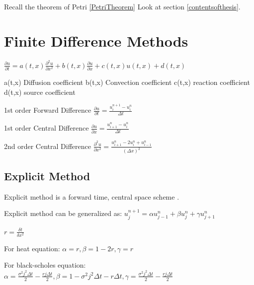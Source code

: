 \documentclass[12pt, oneside]{book}
\theoremstyle{plain}
\theoremstyle{definition}
\begin{document}
Recall the theorem of Petri \ref{PetriTheorem}
Look at section \ref{contentsofthesis}.



\section{Finite Difference Methods}
$ \frac{\partial u}{\partial t} = a(t,x) \frac{\partial^2 u}{\partial x^2} + b(t,x) \frac{\partial u}{\partial x} + c(t,x) u(t,x) + d(t,x) $

a(t,x) Diffusion coefficient
b(t,x) Convection coefficient
c(t,x) reaction coefficient
d(t,x) source coefficient

1st order Forward Difference
$ \frac{\partial u}{\partial t} = \frac{u^{n+1}_i - u^n_i}{\Delta t} $

1st order Central Difference 
$ \frac{\partial u}{\partial x} = \frac{u^{n}_{i+1} - u^n_i}{\Delta t} $

2nd order Central Difference 
$ \frac{\partial^2 u}{\partial x^2} = \frac{u^n_{i+1}- 2u^n_i + u^n_{i-1}}{(\Delta x)^2} $



\subsection{Explicit Method}
Explicit method is a forward time, central space scheme .

Explicit method can be generalized as:
$ u_j^{n+1} = \alpha u_{j-1}^{n} + \beta u_{j}^{n} + \gamma u_{j+1}^{n} $

$ r = \frac{\delta t}{\delta x^2} $

For heat equation:
$ \alpha =  r, \beta = 1 - 2r, \gamma = r $

For black-scholes equation:
$ \alpha =  \frac{\sigma^2 j^2 \Delta t}{2} - \frac{r j \Delta t}{2}, \beta = 1 - \sigma^2 j^2 \Delta t - r \Delta t, \gamma = \frac{\sigma^2 j^2 \Delta t}{2} - \frac{r j \Delta t}{2} $

\end{document}
